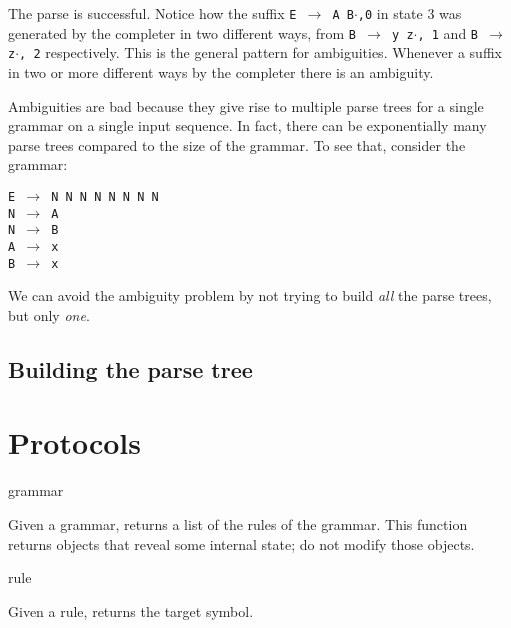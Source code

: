 \documentclass[11pt]{article}
\def\ReadOnly{This function returns objects that reveal some internal state;
do not modify those objects.\ }
\def\ra{\rightarrow}
\begin{document}
The parse is successful.  Notice how the suffix \texttt{E $\ra$ A
  B$\cdot$,0} in state $3$ was generated by the completer in two
  different ways, from \texttt{B $\ra$ y z$\cdot$, 1} and \texttt{B
  $\ra$ z$\cdot$, 2} respectively.  This is the general pattern for
  ambiguities.  Whenever a suffix in two or more different ways by the
  completer there is an ambiguity.  

Ambiguities are bad because they give rise to multiple parse trees for
a single grammar on a single input sequence.  In fact, there can be
exponentially many parse trees compared to the size of the grammar.
To see that, consider the grammar:

\texttt{E $\ra$ N N N N N N N N\\N $\ra$ A\\N $\ra$ B\\A $\ra$ x\\B $\ra$ x} 

We can avoid the ambiguity problem by not trying to build \emph{all}
the parse trees, but only \emph{one}.  

\subsection{Building the parse tree}

\section{Protocols}



 {grammar}

Given a grammar, returns a list of the rules of the
grammar. {\ReadOnly}

 {rule}

Given a rule, returns the target symbol.  
\end{document}
